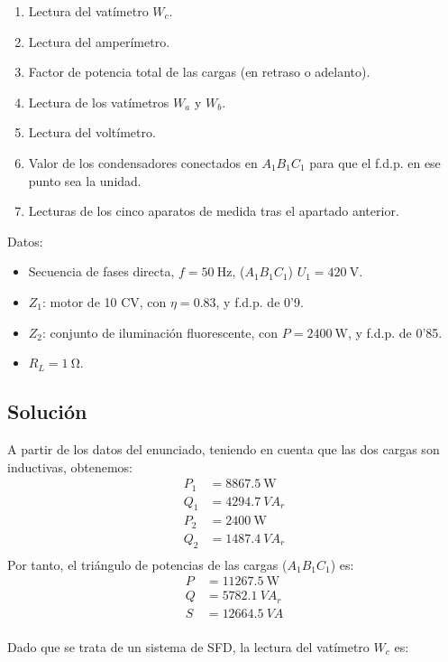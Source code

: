 \begin{enumerate}
\item Lectura del vatímetro $W_c$.
\item Lectura del amperímetro.
\item Factor de potencia total de las cargas (en retraso o
  adelanto).
\item Lectura de los vatímetros $W_a$ y $W_b$.
\item Lectura del voltímetro.
\item Valor de los condensadores conectados en $A_1B_1C_1$ para
  que el f.d.p. en ese punto sea la unidad.
\item Lecturas de los cinco aparatos de medida tras el apartado
  anterior.
\end{enumerate}

Datos:
\begin{itemize}
\item Secuencia de fases directa, $f = \SI{50}{\hertz}$, ($A_1B_1C_1$)
  $U_1 = \SI{420}{\volt}$.
\item $Z_1$: motor de 10 CV, con $\eta = 0.83$, y f.d.p. de 0'9.
\item $Z_2$: conjunto de iluminación fluorescente, con
  $P = \SI{2400}{\watt}$, y f.d.p. de 0'85.
\item $R_L = \SI{1}{\ohm}$.
\end{itemize}

\subsection*{Solución}

A partir de los datos del enunciado, teniendo en cuenta que las dos
cargas son inductivas, obtenemos:
\begin{align*}
  P_1 &= \SI{8867.5}{\watt}\\
  Q_1 &= \SI{4294.7}{VA}_r\\
  P_2 &= \SI{2400}{\watt}\\
  Q_2 &= \SI{1487.4}{VA}_r\\
\end{align*}
Por tanto, el triángulo de potencias de las cargas ($A_1B_1C_1$) es:
\begin{align*}
  P &= \SI{11267.5}{\watt}\\
  Q &= \SI{5782.1}{VA}_r\\
  S &= \SI{12664.5}{VA}\\
\end{align*}

Dado que se trata de un sistema de SFD, la lectura del vatímetro $W_c$
es:

